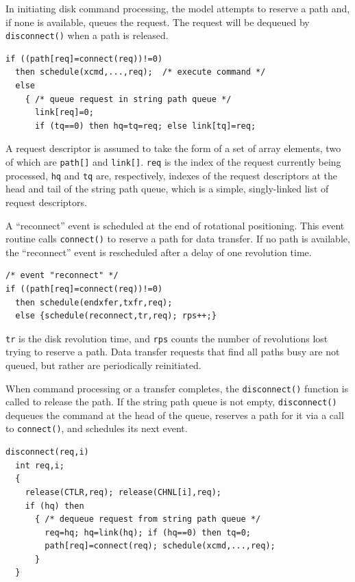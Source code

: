 In initiating disk command processing, the model attempts to reserve a
path and, if none is available, queues the request. The request will be
dequeued by \texttt{disconnect()} when a path is released.
\begin{verbatim}
if ((path[req]=connect(req))!=0)
  then schedule(xcmd,...,req);  /* execute command */
  else
    { /* queue request in string path queue */
      link[req]=0;
      if (tq==0) then hq=tq=req; else link[tq]=req;
\end{verbatim}

A request descriptor is assumed to take the form of a set of array elements,
two of which are \texttt{path[]} and \texttt{link[]}. \texttt{req} is the index of the request
currently being processed, \texttt{hq} and \texttt{tq} are, respectively, indexes of the request
descriptors at the head and tail of the string path queue, which is a simple,
singly-linked list of request descriptors.

A ``reconnect'' event is scheduled at the end of rotational positioning.
This event routine calls \texttt{connect()} to reserve a path for data transfer. If no
path is available, the ``reconnect'' event is rescheduled after a delay of one
revolution time.
\begin{verbatim}
/* event "reconnect" */
if ((path[req]=connect(req))!=0)
  then schedule(endxfer,txfr,req);
  else {schedule(reconnect,tr,req); rps++;}
\end{verbatim}

\texttt{tr} is the disk revolution time, and \texttt{rps} counts the number of revolutions lost
trying to reserve a path. Data transfer requests that find all paths busy are
not queued, but rather are periodically reinitiated.

When command processing or a transfer completes, the \texttt{disconnect()}
function is called to release the path. If the string path queue is not empty,
\texttt{disconnect()} dequeues the command at the head of the queue, reserves a
path for it via a call to \texttt{connect()}, and schedules its next event.
\begin{verbatim}
disconnect(req,i)
  int req,i;
  {
    release(CTLR,req); release(CHNL[i],req);
    if (hq) then
      { /* dequeue request from string path queue */
        req=hq; hq=link(hq); if (hq==0) then tq=0;
        path[req]=connect(req); schedule(xcmd,...,req);
      }
  }
\end{verbatim}

